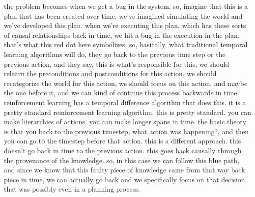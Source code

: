 the problem becomes when we get a bug in the system.
so, imagine that this is a plan that has been created over time.
we've imagined simulating the world and we've developed this plan.
when we're executing this plan, which has these sorts of causal relationships back in time, we hit a bug in the execution in the plan.
that's what this red dot here symbolizes.
so, basically, what traditional temporal learning algorithms will do, they go back to the previous time step or the previous action, and they say, this is what's responsible for this, we should relearn the preconditions and postconditions for this action, we should recategorize the world for this action, we should focus on this action, and maybe the one before it, and we can kind of continue this process backwards in time.
reinforcement learning has a temporal difference algorithm that does this.
it is a pretty standard reinforcement learning algorithm.
this is pretty standard.
you can make hierarchies of actions.
you can make longer spans in time.
the basic theory is that you back to the previous timestep, what action was happening?, and then you can go to the timestep before that action.
this is a different approach.
this doesn't go back in time to the previous action.
this goes back causally through the provenance of the knowledge.
so, in this case we can follow this blue path, and since we know that this faulty piece of knowledge came from that way back piece in time, we can actually go back and we specifically focus on that decision that was possibly even in a planning process.

